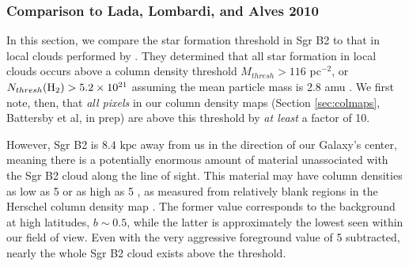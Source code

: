 \documentclass[twocolumn]{aastex61}
\newcommand{\dsgrb}{\ensuremath{8.4\textrm{~kpc}}\xspace}
\begin{document}
\subsubsection{Comparison to Lada, Lombardi, and Alves 2010}
\label{sec:ladathreshold}
In this section, we compare the star formation threshold in Sgr B2 to that in
local clouds performed by \citet{Lada2010a}.  They determined that all star
formation in local clouds occurs above a column density threshold $M_{thresh} >
116$ \msun pc$^{-2}$, or $N_{thresh}(\textrm{H}_{2}) > 5.2\times10^{21}$ \persc assuming the
mean particle mass is 2.8 amu \citep{Kauffmann2008a}.  We first note, then,
that \emph{all pixels} in our column density maps (Section \ref{sec:colmaps},
Battersby et al, in prep) are above this threshold by \emph{at least} a factor
of 10.

However, Sgr B2 is \dsgrb away from us in the direction of our Galaxy's
center, meaning there is a potentially enormous amount of material unassociated
with the Sgr B2 cloud along the line of sight.  This material may have column
densities as low as
5 \persc or as high as 5 \persc, as measured from relatively
blank regions in the Herschel column density map \citep{Battersby2011a}.  The
former value corresponds to
the background at high latitudes, $b\sim0.5$, while the latter  is
approximately the lowest seen within our field of view. 
Even with the very aggressive foreground value of 5 \persc subtracted,
nearly the whole Sgr B2 cloud exists above the \citet{Lada2010a} threshold.
\end{document}
